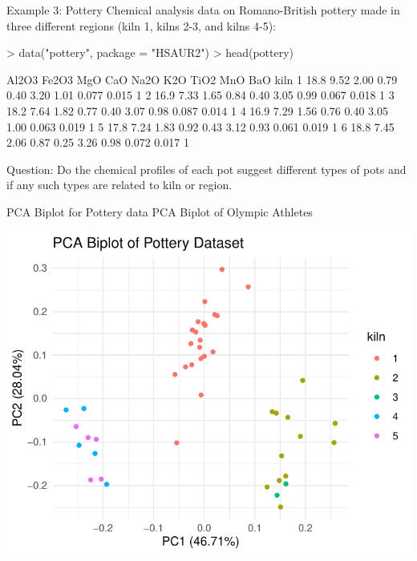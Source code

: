\documentclass[11pt,handout,aspectratio=169]{beamer}
\begin{document}
\begin{frame}[fragile]{Example 3: Pottery}
Chemical analysis data on Romano-British pottery made in three different regions (kiln 1, kilns 2-3, and kilns 4-5):{\scriptsize
\begin{Schunk}
\begin{Sinput}
> data("pottery", package = "HSAUR2")
> head(pottery)
\end{Sinput}
\begin{Soutput}
  Al2O3 Fe2O3  MgO  CaO Na2O  K2O TiO2   MnO   BaO kiln
1  18.8  9.52 2.00 0.79 0.40 3.20 1.01 0.077 0.015    1
2  16.9  7.33 1.65 0.84 0.40 3.05 0.99 0.067 0.018    1
3  18.2  7.64 1.82 0.77 0.40 3.07 0.98 0.087 0.014    1
4  16.9  7.29 1.56 0.76 0.40 3.05 1.00 0.063 0.019    1
5  17.8  7.24 1.83 0.92 0.43 3.12 0.93 0.061 0.019    1
6  18.8  7.45 2.06 0.87 0.25 3.26 0.98 0.072 0.017    1
\end{Soutput}
\end{Schunk}
}
Question: Do the chemical profiles of each pot suggest different types of pots and if any such types are related to kiln or region.
\end{frame}


\begin{frame}[fragile]{PCA Biplot for Pottery data}
PCA Biplot of Olympic Athletes	{\scriptsize
\begin{center}
\includegraphics[width=.6\textwidth]{pics/plot4.2.pdf}		
\end{center}}
\end{frame}
\end{document}
